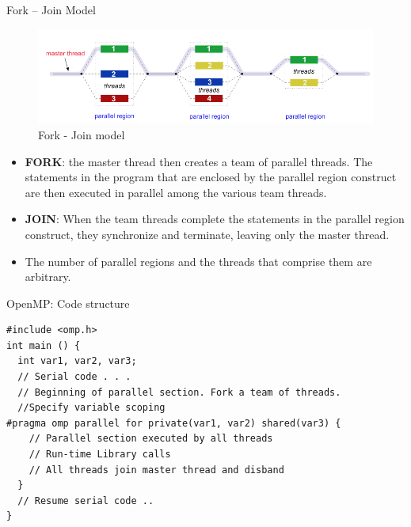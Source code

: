 \documentclass[10pt,times]{beamer}
\begin{document}
\begin{frame}{Fork – Join Model}

\begin{figure}
\includegraphics[width=\linewidth]{figs/fork_join}
\caption*{Fork - Join model}
\end{figure}

\begin{itemize}
\item \textbf{FORK}: the master thread then creates a team of parallel threads.
The statements in the program that are enclosed by the parallel region
construct are then executed in parallel among the various team
threads.
\item \textbf{JOIN}: When the team threads complete the statements in the parallel
region construct, they synchronize and terminate, leaving only the
master thread.
\item The number of parallel regions and the threads that comprise them are
arbitrary.
\end{itemize}
\end{frame}
\begin{frame}[fragile]{OpenMP: Code structure}

\begin{verbatim}
#include <omp.h>
int main () {
  int var1, var2, var3;
  // Serial code . . .
  // Beginning of parallel section. Fork a team of threads.
  //Specify variable scoping
#pragma omp parallel for private(var1, var2) shared(var3) {
    // Parallel section executed by all threads
    // Run-time Library calls
    // All threads join master thread and disband
  }
  // Resume serial code ..
}
\end{verbatim}
\end{frame}
\end{document}
